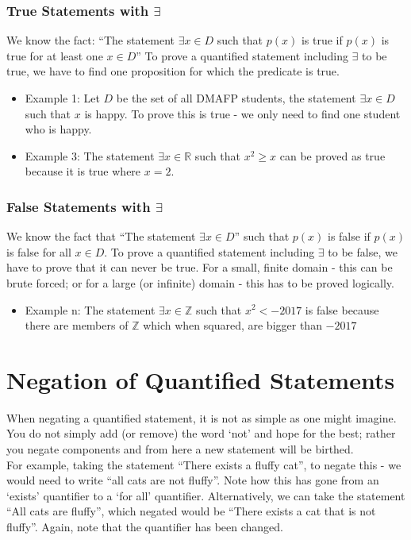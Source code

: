 \subsubsection{True Statements with $\exists$}
We know the fact: ``The statement $\exists x \in D$ such that $p(x)$ is true if $p(x)$ is true for at least one $x \in D$'' To prove a quantified statement including $\exists$ to be true, we have to find one proposition for which the predicate is true. 
\begin{itemize}
    \item Example 1: Let $D$ be the set of all DMAFP students, the statement $\exists x \in D$ such that $x$ is happy. To prove this is true - we only need to find one student who is happy.
    \item Example 3: The statement $\exists x \in \mathbb{R}$ such that $x^2 \geq x$ can be proved as true because it is true where $x=2$.
\end{itemize}
\subsubsection{False Statements with $\exists$}
We know the fact that ``The statement $\exists x \in D$'' such that $p(x)$ is false if $p(x)$ is false for all $x \in D$. To prove a quantified statement including $\exists$ to be false, we have to prove that it can never be true. For a small, finite domain - this can be brute forced; or for a large (or  infinite) domain - this has to be proved logically.
\begin{itemize}
    \item Example n: The statement $\exists x \in \mathbb{Z}$ such that $x^2 < -2017$ is false because there are members of $\mathbb{Z}$ which when squared, are bigger than $-2017$
\end{itemize}

\section{Negation of Quantified Statements}
When negating a quantified statement, it is not as simple as one might imagine. You do not simply add (or remove) the word `not' and hope for the best; rather you negate components and from here a new statement will be birthed.\\

For example, taking the statement ``There exists a fluffy cat'', to negate this - we would need to write ``all cats are not fluffy''. Note how this has gone from an `exists' quantifier to a `for all' quantifier. Alternatively, we can take the statement ``All cats are fluffy'', which negated would be ``There exists a cat that is not fluffy''. Again, note that the quantifier has been changed.\\

